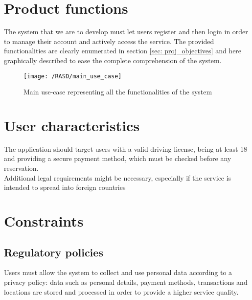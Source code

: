 \section{Product functions}
The system that we are to develop must let users register and then login in order to manage their account and actively access the service. The provided functionalities are clearly enumerated in section \ref{sec: proj_objectives} and here graphically described to ease the complete comprehension of the system.

\begin{figure}[!ht]
	\centering
	\vspace{0.2cm}
	\texttt{[image: /RASD/main\_use\_case]}\\ 
	\vspace{0.5cm}
	\caption{Main use-case representing all the functionalities of the system} \label{fig:main_use_case} 
\end{figure}

\section{User characteristics}
The application should target users with a valid driving license, being at least 18 and providing a secure payment method, which must be checked before any reservation.
\\Additional legal requirements might be necessary, especially if the service is intended to spread into foreign countries
\section{Constraints}
\subsection{Regulatory policies}
Users must allow the system to collect and use personal data according to a privacy policy: data such as personal details, payment methods, transactions and locations are stored and processed in order to provide a higher service quality.
